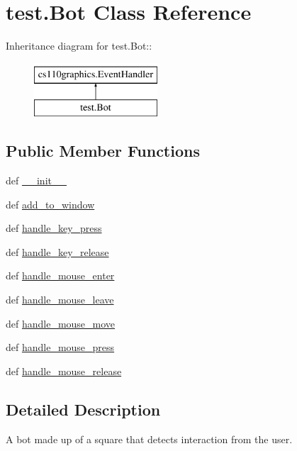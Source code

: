 \hypertarget{classtest_1_1Bot}{
\section{test.Bot Class Reference}
\label{classtest_1_1Bot}
}
Inheritance diagram for test.Bot::\begin{figure}[H]
\begin{center}
\leavevmode
\includegraphics[height=2cm]{classtest_1_1Bot}
\end{center}
\end{figure}
\subsection*{Public Member Functions}
\begin{DoxyCompactItemize}
\item 
def \hyperlink{classtest_1_1Bot_afd02701d66ad1d70592c747a8fe4b31e}{\_\-\_\-init\_\-\_\-}
\item 
def \hyperlink{classtest_1_1Bot_a91d816dfcbfb7312349556dbae3737e6}{add\_\-to\_\-window}
\item 
def \hyperlink{classtest_1_1Bot_a23b90152ec8fa124851cd5fe6944beed}{handle\_\-key\_\-press}
\item 
def \hyperlink{classtest_1_1Bot_a173d0fff530e0987193e9006b24f218b}{handle\_\-key\_\-release}
\item 
def \hyperlink{classtest_1_1Bot_a0b184ab86d0dd6121e55394a24c8751e}{handle\_\-mouse\_\-enter}
\item 
def \hyperlink{classtest_1_1Bot_a2b65e6ecaba1afb4f117b74a684b4387}{handle\_\-mouse\_\-leave}
\item 
def \hyperlink{classtest_1_1Bot_ad1464516fb04013fa7e353a78f0ec218}{handle\_\-mouse\_\-move}
\item 
def \hyperlink{classtest_1_1Bot_a970422a4391cc2b9ff89a2e42063bb6e}{handle\_\-mouse\_\-press}
\item 
def \hyperlink{classtest_1_1Bot_a18fc05b6e2c1e42e1b6c639f4844a059}{handle\_\-mouse\_\-release}
\end{DoxyCompactItemize}


\subsection{Detailed Description}
\begin{DoxyVerb}A bot made up of a square that detects interaction from the user. \end{DoxyVerb}
 


